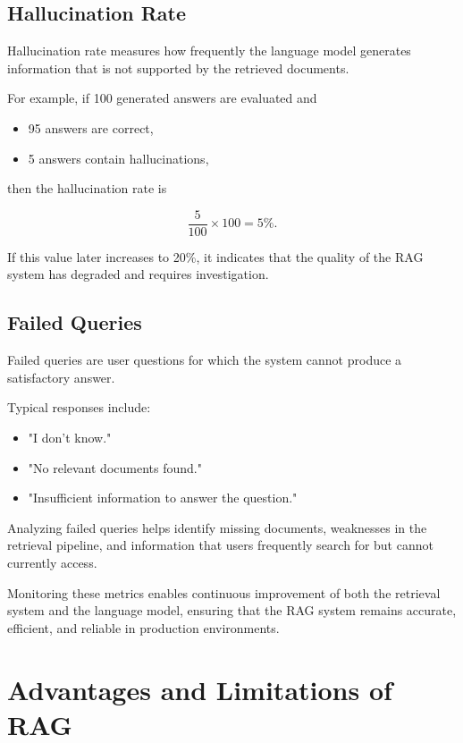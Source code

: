 \subsection*{Hallucination Rate}

Hallucination rate measures how frequently the language model generates information that is not supported by the retrieved documents.

For example, if 100 generated answers are evaluated and

\begin{itemize}
    \item 95 answers are correct,
    \item 5 answers contain hallucinations,
\end{itemize}

then the hallucination rate is

\[
\frac{5}{100}\times100 = 5\%.
\]

If this value later increases to 20\%, it indicates that the quality of the RAG system has degraded and requires investigation.

\subsection*{Failed Queries}

Failed queries are user questions for which the system cannot produce a satisfactory answer.

Typical responses include:

\begin{itemize}
    \item "I don't know."
    \item "No relevant documents found."
    \item "Insufficient information to answer the question."
\end{itemize}

Analyzing failed queries helps identify missing documents, weaknesses in the retrieval pipeline, and information that users frequently search for but cannot currently access.

Monitoring these metrics enables continuous improvement of both the retrieval system and the language model, ensuring that the RAG system remains accurate, efficient, and reliable in production environments.

\section{Advantages and Limitations of RAG}

